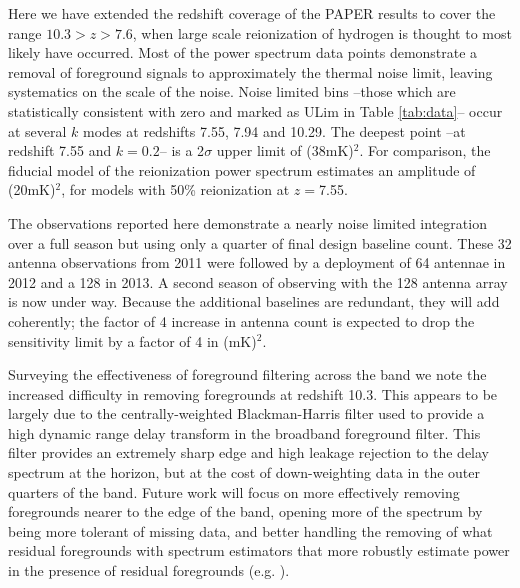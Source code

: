\documentclass[preprint]{aastex}
\begin{document}
Here we have extended the redshift coverage of the \cite{Parsons:2014p10499} PAPER results to cover the range $10.3>z>7.6$, when large scale reionization of hydrogen is thought to most likely have occurred.  Most of the power spectrum data points demonstrate a removal of foreground signals to approximately the thermal noise limit, leaving systematics on the scale of the noise. Noise limited bins --those which are statistically consistent with zero and marked as ULim in Table \ref{tab:data}-- occur at several $k$ modes at redshifts 7.55, 7.94 and 10.29. The deepest point --at redshift 7.55 and $k=0.2$-- is a 2$\sigma$ upper limit of (38mK)$^2$. For comparison, the \citet{Lidz:2008p8251} fiducial model of the reionization power spectrum estimates an amplitude of (20mK)$^2$, for models with 50\% reionization at $z=$7.55.  

The observations reported here demonstrate a nearly noise limited integration over a full season but using only a quarter of final design baseline count. These  32 antenna observations from 2011 were followed by a deployment of 64 antennae in 2012 and a 128 in 2013.  A second season of observing with the 128 antenna array is now under way. Because the additional baselines are redundant, they will add coherently; the factor of 4 increase in antenna count is expected to drop the sensitivity limit by a factor of 4 in (mK)$^2$.




Surveying the effectiveness of foreground filtering across the band we note the increased difficulty in removing foregrounds at redshift 10.3.  This appears to be largely due to the centrally-weighted Blackman-Harris filter used to provide a high dynamic range delay transform in the broadband foreground filter. This filter provides an extremely sharp edge and high leakage rejection to the delay spectrum at the horizon, but at the cost of down-weighting data in the outer quarters of the band. Future work will focus on more effectively removing foregrounds nearer to the edge of the band, opening more of the spectrum by being more tolerant of missing data, and better handling the removing of what residual foregrounds with spectrum estimators that more robustly estimate power in the presence of residual foregrounds (e.g. \cite{Liu:2011p8763}).




\end{document}
